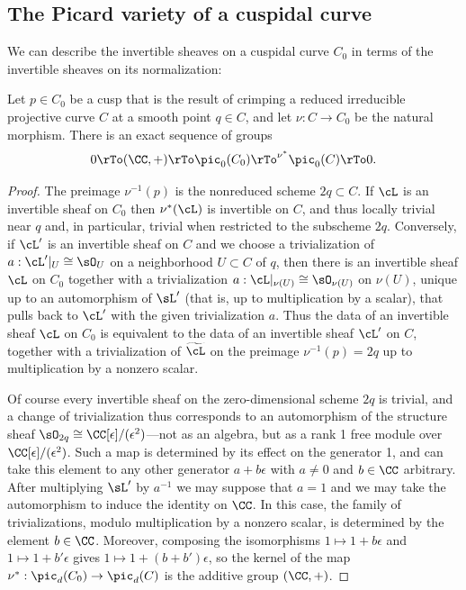 \subsection{The Picard variety of a cuspidal curve}

We can describe the invertible sheaves on a cuspidal curve $C_{0}$ in terms of the invertible sheaves on its
normalization:

\begin{proposition}\label{torsion-free on cuspidal}
Let $p\in C_{0}$ be a cusp that is the result of crimping a reduced irreducible projective curve $C$ at a smooth point $q\in C$,
and let $\nu: C\to C_{0}$ be the natural morphism.
There is an exact sequence of groups
$$
0 \rTo (\CC,+) \rTo \pic_0(C_{0}) \rTo^{\nu^*} \pic_0(C) \rTo 0.
$$
\end{proposition}

\begin{proof}
The preimage $\nu^{-1}(p)$ is the nonreduced scheme $2q \subset C$. If $\cL$ is an invertible sheaf on 
$C_{0}$ then $\nu^{*}(\cL)$ is invertible on $C$, and thus locally trivial near $q$ and, in particular, trivial
when restricted to the subscheme $2q$. Conversely,
if $\cL'$ is an invertible sheaf on $C$ and we choose a trivialization of $a: \cL'|_{U}\cong \sO_{U}$ on a neighborhood $ U\subset C$
of $q$, then there is an invertible sheaf $\cL$ on $C_{0}$ together with a  trivialization
$a: \cL|_{\nu(U)}\cong \sO_{\nu(U)}$
on $\nu(U)$, unique up to an automorphism of $\sL'$ (that is, up to multiplication by a scalar), that
pulls back to $\cL'$ with the given trivialization $a$.
Thus the data of an invertible sheaf $\cL$ on $C_0$ is equivalent to the data of an invertible sheaf $\cL'$ on $C$, together with a trivialization of $\widetilde \cL$ on the preimage $\nu^{-1}(p) = 2q$ up to multiplication by a nonzero scalar.

Of course every invertible sheaf on the zero-dimensional scheme $2q$ is trivial, and a change of trivialization
thus corresponds to an automorphism of the structure sheaf $\sO_{2q} \cong \CC[\epsilon]/(\epsilon^{2})$---not as an algebra, but as a rank 1 free module over $\CC[\epsilon]/(\epsilon^{2})$. Such a map is determined by
its effect on the generator 1, and can take this element to any other generator $a+b\epsilon$ with
$a\neq 0$ and $b\in \CC$ arbitrary. After multiplying $\sL'$ by $a^{-1}$
we may suppose that $a =1$ and we may take the automorphism to induce the identity on $\CC$.
In this case, the family of trivializations, modulo multiplication by a nonzero scalar, is 
determined by the element $b\in \CC$. Moreover, composing the isomorphisms
$1\mapsto 1+b\epsilon$ and $1\mapsto 1+b'\epsilon$  gives $1\mapsto 1+(b+b')\epsilon$,
so the kernel of the map $\nu^{*}: \pic_{d}(C_{0}) \to \pic_{d}(C)$ is 
the additive group $(\CC, +)$.
\end{proof}

